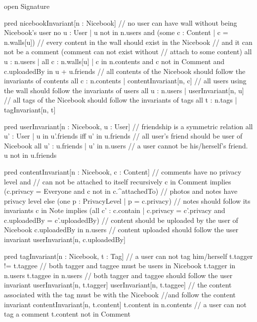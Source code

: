 \documentclass[titlepage]{article}
\begin{document}
\begin{alloy}
open Signature

pred nicebookInvariant[n : Nicebook] {
    // no user can have wall without being Nicebook's user
    no u : User | u not in n.users and (some c : Content | c = n.walls[u])
    // every content in the wall should exist in the Nicebook
    // and it can not be a comment (comment can not exist without
    // attach to some content)
    all u : n.users | all c : n.walls[u] | c in n.contents
        and c not in Comment and c.uploadedBy in u + u.friends
    // all contents of the Nicebook should follow the invariants of contents
    all c : n.contents | contentInvariant[n, c]
    // all users using the wall should follow the invariants of users
    all u : n.users | userInvariant[n, u]
    // all tags of the Nicebook should follow the invariants of tags
    all t : n.tags | tagInvariant[n, t]
}

pred userInvariant[n : Nicebook, u : User] {
    // friendship is a symmetric relation
    all u' : User | u in u'.friends iff u' in u.friends
    // all user's friend should be user of Nicebook
    all u' : u.friends | u' in n.users
    // a user cannot be his/herself's friend.
    u not in u.friends
}

pred contentInvariant[n : Nicebook, c : Content] {
    // comments have no privacy level and
    // can not be attached to itself recursively
    c in Comment implies 
        (c.privacy = Everyone and 
        c not in c.^attachedTo)
    // photos and notes have privacy level
    else (one p : PrivacyLevel | p = c.privacy)
    // notes should follow its invariants
    c in Note implies 
        (all c' : c.contain | 
            c.privacy = c'.privacy and 
            c.uploadedBy = c'.uploadedBy)
    // content should be uploaded by the user of Nicebook
    c.uploadedBy in n.users
    // content uploaded should follow the user invariant
    userInvariant[n, c.uploadedBy]
}

pred tagInvariant[n : Nicebook, t : Tag] {
    // a user can not tag him/herself
    t.tagger != t.taggee
    // both tagger and taggee must be users in Nicebook
    t.tagger in n.users
    t.taggee in n.users
    // both tagger and taggee should follow the user invariant
    userInvariant[n, t.tagger]
    userInvariant[n, t.taggee]
    // the content associated with the tag must be with the Nicebook 
    //and follow the content invariant
    contentInvariant[n, t.content]
    t.content in n.contents
    // a user can not tag a comment
    t.content not in Comment
}    
\end{alloy}
\end{document}
